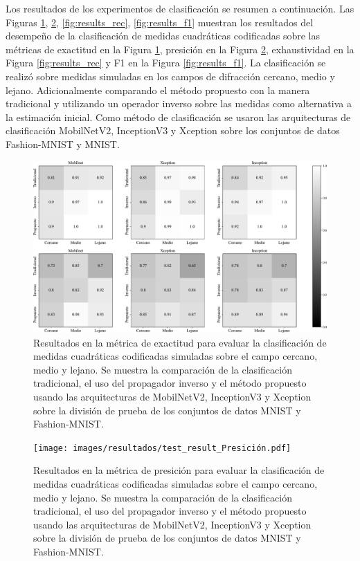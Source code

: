 Los resultados de los experimentos de clasificación se resumen a continuación. Las Figuras \ref{fig:results_acc}, \ref{fig:results_pre},  \ref{fig:results_rec}, \ref{fig:results_f1} muestran los resultados del desempeño de la clasificación de medidas cuadráticas codificadas sobre las métricas de exactitud en la Figura \ref{fig:results_acc}, presición en la Figura \ref{fig:results_pre}, exhaustividad  en la Figura \ref{fig:results_rec} y F1 en la Figura \ref{fig:results_f1}. La clasificación se realizó sobre medidas simuladas en los campos de difracción cercano, medio y lejano. Adicionalmente comparando el método propuesto con la manera tradicional y utilizando un operador inverso sobre las medidas como alternativa a la estimación inicial. Como método de clasificación se usaron las arquitecturas de clasificación MobilNetV2, InceptionV3 y Xception sobre los conjuntos de datos Fashion-MNIST y MNIST.


\begin{figure}[!h]
    \centering
    \includegraphics[width=\linewidth]{images/resultados/test_result_Exactitud.pdf}
    \caption{Resultados en la métrica de exactitud para evaluar la clasificación de medidas cuadráticas codificadas simuladas sobre el campo cercano, medio y lejano. Se muestra la comparación de la clasificación tradicional, el uso del propagador inverso y el método propuesto usando las arquitecturas de MobilNetV2, InceptionV3 y Xception sobre la división de prueba de los conjuntos de datos MNIST y Fashion-MNIST.}
    \label{fig:results_acc}
\end{figure}

\begin{figure}[!h]
    \centering
    \texttt{[image: images/resultados/test\_result\_Presición.pdf]}
    \caption{Resultados en la métrica de presición para evaluar la clasificación de medidas cuadráticas codificadas simuladas sobre el campo cercano, medio y lejano. Se muestra la comparación de la clasificación tradicional, el uso del propagador inverso y el método propuesto usando las arquitecturas de MobilNetV2, InceptionV3 y Xception sobre la división de prueba de los conjuntos de datos MNIST y Fashion-MNIST.}
    \label{fig:results_pre}
\end{figure}



